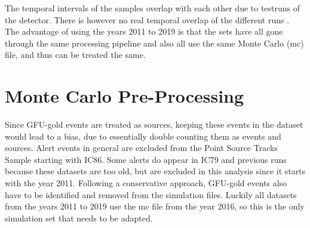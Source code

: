 The temporal intervals of the samples overlap with each other due to testruns of the detector.
There is however no real temporal overlap of the different runs \cite{private_com}.
The advantage of using the years 2011 to 2019 is that the sets have all gone through the same processing pipeline and also all use the same Monte Carlo (mc) file, and thus can be treated the same.

\section{Monte Carlo Pre-Processing}

Since GFU-gold events are treated as sources, keeping these events in the dataset would lead to a bias, due to essentially double counting them as events and sources.
Alert events in general are excluded from the Point Source Tracks Sample starting with IC86.
Some alerts do appear in IC79 and previous runs because these datasets are too old, but are excluded in this analysis since it starts with the year 2011.
Following a conservative approach, GFU-gold events also have to be identified and removed from the simulation files.
Luckily all datasets from the years 2011 to 2019 use the mc file from the year 2016, so this is the only simulation set that needs to be adapted.

